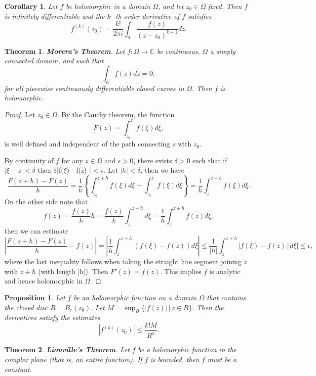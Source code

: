 \documentclass{amsart}
\newtheorem{thm}{Theorem}
\newtheorem{prop}{Proposition}
\newtheorem{cor}{Corollary}
\begin{document}
\begin{cor}
Let \(f\) be holomorphic in a domain \(\Omega\), and let \(z_0\in \Omega\) fixed. Then \(f\) is infinitely differentiable and the \(k\) -th order derivative of \(f\) satisfies
\[ f^{(k)}(z_0) = \frac{k!}{2\pi i} \int_{\alpha}\frac{f(z)}{(z-z_0)^{k+1}}dz. \]
\end{cor}


\begin{thm}
\textbf{Morera's Theorem}. Let \(f:\Omega \to \mathbb{C}\) be continuous, \(\Omega\) a simply connected domain, and such that
\[ \int_{\alpha} f(z) dz = 0, \]
for all piecewise continuously differentiable closed curves in \(\Omega\). Then \(f\) is holomorphic.
\end{thm}
\begin{proof}
Let \(z_0\in \Omega\). By the Cauchy theorem, the function 
\[ F(z) = \int_{z_0}^{z} f(\xi) d\xi,\]
is well defined and independent of the path connecting \(z\) with \(z_0\).

By continuity of \(f\) for any \(z \in \Omega\) and \(\epsilon >0\), there exists \(\delta >0\) such that if \(|\xi - z| < \delta\) then \$|f(\(\xi\)) - f(z) | < \(\epsilon\). Let \(|h| < \delta\), then we have
\[ \frac{F(z + h) - F(z)}{h} = \frac{1}{h} \left\{ \int_{z_0}^{z + h} f(\xi)d\xi  - \int_{z_0}^{z} f(\xi)d\xi \right\} = \frac{1}{h}\int_{z}^{z + h} f(\xi)d\xi. \]
On the other side note that 
\[ f(z) = \frac{f(z)}{h} h = \frac{f(z)}{h} \int_{z}^{z+h} d\xi = \frac{1}{h} \int_{z}^{z+h} f(z) d\xi, \]
then we can estimate
\[ \left| \frac{F(z + h) - F(z)}{h} - f(z) \right| = \left| \frac{1}{h} \int_{z}^{z+h} (f(\xi) - f(z)) d\xi \right| \leq \frac{1}{|h|} \int_{z}^{z+h} \left|f(\xi) - f(z)\right| \left| d\xi \right| \leq \epsilon,\]
where the last inequality follows when taking the straight line segment joining \(z\) with \(z + h\) (with length |h|).
Then \(F'(z) = f(z)\). This implies \(f\) is analytic and hence holomorphic in \(\Omega\).
\end{proof}

\begin{prop}
Let \(f\) be an holomorphic function on a domain \(\Omega\) that contains the closed disc \(B = \bar{B}_r(z_0)\). Let \(M = \sup_{B} \{ |f(z)| \, | \, z \in B\}\). Then the derivatives satisfy the estimates
\[ \left| f^{(k)}(z_0)\right| \leq \frac{k! M}{R^k} .\]
\end{prop}


\begin{thm}
\textbf{Liouville's Theorem}. Let \(f\) be a holomorphic function in the complex plane (that is, an entire function). If \(f\) is bounded, then \(f\) must be a constant.
\end{thm}
\end{document}
